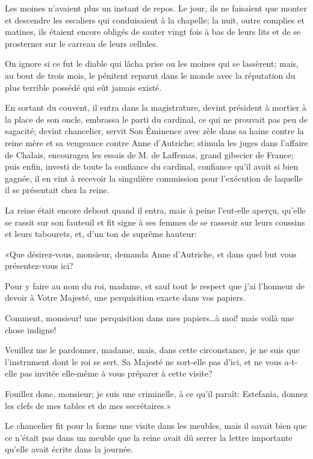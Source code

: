 Les moines n'avaient plus un instant de repos. Le jour, ils ne faisaient que monter et descendre les escaliers qui conduisaient à la chapelle; la nuit, outre complies et matines, ils étaient encore obligés de sauter vingt fois à bas de leurs lits et de se prosterner sur le carreau de leurs cellules. 

On ignore si ce fut le diable qui lâcha prise ou les moines qui se lassèrent; mais, au bout de trois mois, le pénitent reparut dans le monde avec la réputation du plus terrible possédé qui eût jamais existé. 

En sortant du couvent, il entra dans la magistrature, devint président à mortier à la place de son oncle, embrassa le parti du cardinal, ce qui ne prouvait pas peu de sagacité; devint chancelier, servit Son Éminence avec zèle dans sa haine contre la reine mère et sa vengeance contre Anne d'Autriche; stimula les juges dans l'affaire de Chalais, encouragea les essais de M. de Laffemas, grand gibecier de France; puis enfin, investi de toute la confiance du cardinal, confiance qu'il avait si bien gagnée, il en vint à recevoir la singulière commission pour l'exécution de laquelle il se présentait chez la reine. 

La reine était encore debout quand il entra, mais à peine l'eut-elle aperçu, qu'elle se rassit sur son fauteuil et fit signe à ses femmes de se rasseoir sur leurs coussins et leurs tabourets, et, d'un ton de suprême hauteur: 

«Que désirez-vous, monsieur, demanda Anne d'Autriche, et dans quel but vous présentez-vous ici? 

\speak  Pour y faire au nom du roi, madame, et sauf tout le respect que j'ai l'honneur de devoir à Votre Majesté, une perquisition exacte dans vos papiers. 

\speak  Comment, monsieur! une perquisition dans mes papiers\dots à moi! mais voilà une chose indigne! 

\speak  Veuillez me le pardonner, madame, mais, dans cette circonstance, je ne suis que l'instrument dont le roi se sert. Sa Majesté ne sort-elle pas d'ici, et ne vous a-t-elle pas invitée elle-même à vous préparer à cette visite? 

\speak  Fouillez donc, monsieur; je suis une criminelle, à ce qu'il paraît: Estefania, donnez les clefs de mes tables et de mes secrétaires.» 

Le chancelier fit pour la forme une visite dans les meubles, mais il savait bien que ce n'était pas dans un meuble que la reine avait dû serrer la lettre importante qu'elle avait écrite dans la journée. 

